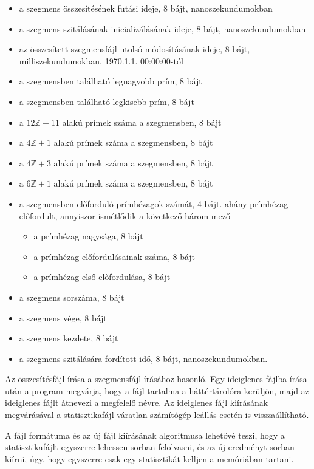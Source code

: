 \begin{itemize}
\item a szegmens összesítésének futási ideje, 8 bájt, nanoszekundumokban
\item a szegmens szitálásának inicializálásának ideje, 8 bájt, nanoszekundumokban
\item az összesített szegmensfájl utolsó módosításának ideje, 8 bájt, milliszekundumokban, 1970.1.1. 00:00:00-tól
\item a szegmensben található legnagyobb prím, 8 bájt
\item a szegmensben található legkisebb prím, 8 bájt
\item a $12\mathbb{Z}+11$ alakú prímek száma a szegmensben, 8 bájt
\item a $4\mathbb{Z}+1$ alakú prímek száma a szegmensben, 8 bájt
\item a $4\mathbb{Z}+3$ alakú prímek száma a szegmensben, 8 bájt
\item a $6\mathbb{Z}+1$ alakú prímek száma a szegmensben, 8 bájt
\item a szegmensben előforduló prímhézagok számát, 4 bájt. ahány prímhézag előfordult, annyiszor ismétlődik a következő három mező
\begin{itemize}
\item a prímhézag nagysága, 8 bájt
\item a prímhézag előfordulásainak száma, 8 bájt
\item a prímhézag első előfordulása, 8 bájt
\end{itemize}
\item a szegmens sorszáma, 8 bájt
\item a szegmens vége, 8 bájt
\item a szegmens kezdete, 8 bájt
\item a szegmens szitálására fordított idő, 8 bájt, nanoszekundumokban.
\end{itemize}

Az összesítésfájl írása a szegmensfájl írásához hasonló.
Egy ideiglenes fájlba írása után a program megvárja, hogy a fájl tartalma a háttértárolóra kerüljön, majd az ideiglenes fájlt átnevezi a megfelelő névre.
Az ideiglenes fájl kiírásának megvárásával a statisztikafájl váratlan számítógép leállás esetén is visszaállítható.

A fájl formátuma és az új fájl kiírásának algoritmusa lehetővé teszi, hogy a statisztikafájlt egyszerre lehessen sorban felolvasni, és az új eredményt sorban kiírni, úgy, hogy egyszerre csak egy statisztikát kelljen a memóriában tartani.

